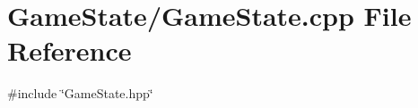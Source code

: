 \section{Game\+State/\+Game\+State.cpp File Reference}
\label{_game_state_8cpp}
{\ttfamily \#include \char`\"{}Game\+State.\+hpp\char`\"{}}\newline
